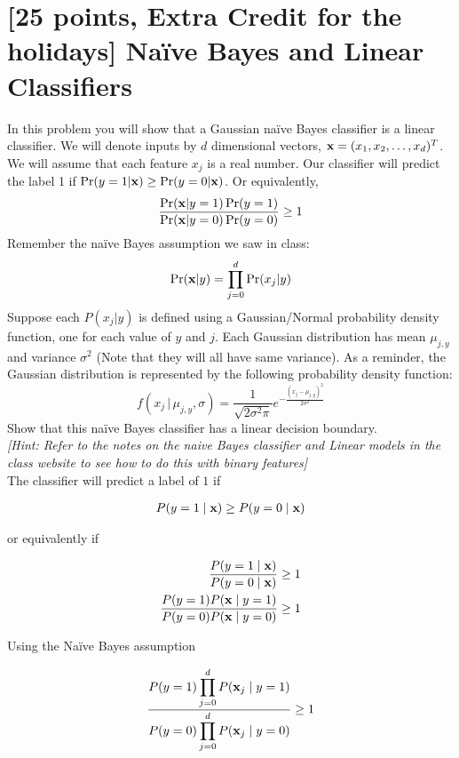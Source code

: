 \section{[25 points, Extra Credit for the holidays] Na\"ive Bayes and Linear Classifiers }
\label{sec:q1}


In this problem you will show that a Gaussian na\"ive Bayes classifier is a linear classifier. We will denote inputs by $d$ dimensional vectors, ${\bf x} = (x_1, x_2,\dots, x_d)^T$. We will assume that each feature $x_j$ is a real number. Our classifier will predict the label 1 if $\Pr(y=1|{\bf x}) \geq \Pr(y=0|{\bf x})$. Or equivalently,
\[
\frac{\Pr({\bf x} | y=1)\Pr(y=1)}{\Pr({\bf x} | y=0)\Pr(y=0)} \geq 1
\]
Remember the na\"ive Bayes assumption we saw in class:
\[
\Pr({\bf x}|y) = \prod_{j=0}^{d}\Pr(x_j|y)
\]
Suppose each $P(x_j|y)$ is defined using a Gaussian/Normal probability density function, one for each value of $y$ and $j$. Each Gaussian distribution has mean $\mu_{j,y}$ and variance $\sigma^2$ (Note that they will all have same variance). As a reminder, the Gaussian distribution is represented by the following probability density function:
\[
f(x_j\,|\,\mu_{j,y}, \sigma) = \frac{1}{\sqrt{2\sigma^2\pi}}e^{-\frac{(x_j-\mu_{j,y})^2}{2\sigma^2}}
\]
Show that this na\"ive Bayes classifier has a linear decision boundary.\\ \textit{[Hint: Refer to the notes on the naive Bayes classifier and Linear models in the class website to see how to do this with binary features]}\\

The classifier will predict a label of $1$ if 

\begin{equation*}
\begin{aligned}
P(y=1 \mid {\bf x}) \geq P(y=0 \mid {\bf x})
\end{aligned}
\end{equation*}

or equivalently if

\begin{equation*}
\begin{aligned}
\frac{P(y=1 \mid {\bf x}) }{ P(y=0 \mid {\bf x})} \geq 1\\
\frac{P(y=1) P({\bf x}  \mid y=1) }{ P(y=0) P({\bf x} \mid y=0)} \geq 1
\end{aligned}
\end{equation*}

Using the Na\"ive Bayes assumption

\begin{equation*}
\begin{aligned}
\frac{P(y=1) \displaystyle \prod_{j=0}^{d} P({\bf x}_j  \mid y=1) }{ P(y=0) \displaystyle \prod_{j=0}^{d} P({\bf x}_j \mid y=0)} \geq 1
\end{aligned}
\end{equation*}

